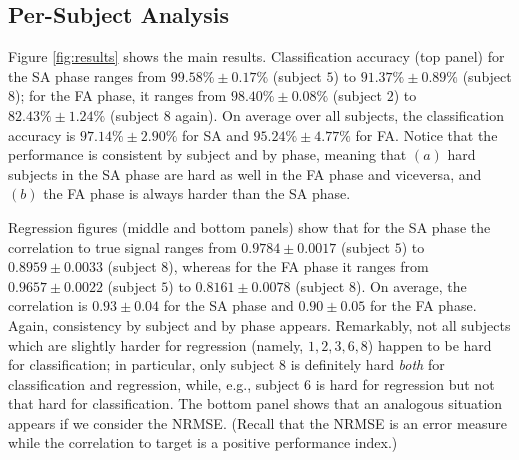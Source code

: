 \documentclass[10pt]{bmc_article}
\def\texttt{[image: ]}
\newenvironment{bmcformat}{\begin{raggedright}\baselineskip20pt\sloppy\setboolean{publ}{false}}{\end{raggedright}\baselineskip20pt\sloppy}
\begin{document}
\begin{bmcformat}
\subsection*{Per-Subject Analysis}


Figure \ref{fig:results} shows the main results. Classification
accuracy (top panel) for the SA phase ranges
from $99.58\% \pm 0.17\%$ (subject $5$) to $91.37\% \pm 0.89\%$ (subject $8$);
for the FA phase, it ranges
from $98.40\% \pm 0.08\%$ (subject $2$) to $82.43\% \pm 1.24\%$ (subject $8$ again).
On average over all subjects, the classification accuracy is
$97.14\% \pm 2.90\%$ for SA and $95.24\% \pm 4.77\%$ for FA.
Notice that the performance is
consistent by subject and by phase, meaning that $(a)$ hard subjects
in the SA phase are hard as well in the FA phase and viceversa, and
$(b)$ the FA phase is always harder than the SA phase.

Regression figures (middle and bottom panels) show that for the SA phase
the correlation to true signal ranges from
$0.9784 \pm 0.0017$ (subject $5$) to $0.8959 \pm 0.0033$ (subject $8$),
whereas for the FA phase it ranges from
$0.9657 \pm 0.0022$ (subject $5$) to $0.8161 \pm 0.0078$ (subject $8$).
On average, the correlation is $0.93 \pm 0.04$ for the SA phase and
$0.90 \pm 0.05$ for the FA phase. Again, consistency by subject and by
phase appears. Remarkably,
not all subjects which are slightly harder for regression (namely,
$1,2,3,6,8$) happen to be hard for classification; in particular, only
subject $8$ is definitely hard \emph{both} for classification and
regression, while, e.g., subject $6$ is hard for regression but not
that hard for classification. The bottom panel shows that an analogous
situation appears if we consider the NRMSE. (Recall that the NRMSE is
an error measure while the correlation to target is a positive performance
index.)


\end{bmcformat}
\end{document}
